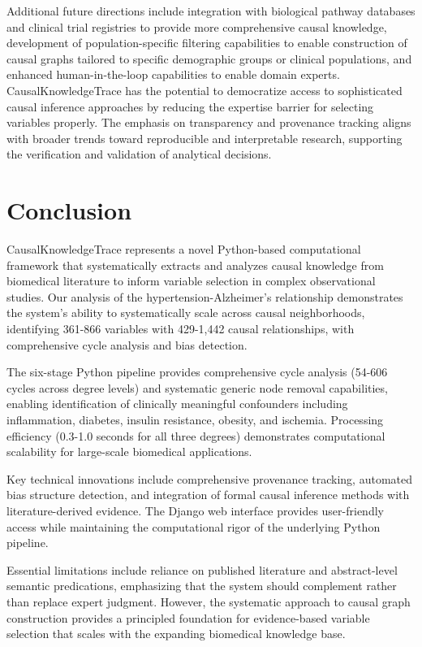 \documentclass[preprint,12pt,numbers,sort&compress]{elsarticle}
\begin{document}
Additional future directions include integration with biological pathway databases and clinical trial registries to provide more comprehensive causal knowledge, development of population-specific filtering capabilities to enable construction of causal graphs tailored to specific demographic groups or clinical populations, and enhanced human-in-the-loop capabilities to enable domain experts. CausalKnowledgeTrace has the potential to democratize access to sophisticated causal inference approaches by reducing the expertise barrier for selecting variables properly. The emphasis on transparency and provenance tracking aligns with broader trends toward reproducible and interpretable research, supporting the verification and validation of analytical decisions.

\section{Conclusion}

CausalKnowledgeTrace represents a novel Python-based computational framework that systematically extracts and analyzes causal knowledge from biomedical literature to inform variable selection in complex observational studies. Our analysis of the hypertension-Alzheimer's relationship demonstrates the system's ability to systematically scale across causal neighborhoods, identifying 361-866 variables with 429-1,442 causal relationships, with comprehensive cycle analysis and bias detection.

The six-stage Python pipeline provides comprehensive cycle analysis (54-606 cycles across degree levels) and systematic generic node removal capabilities, enabling identification of clinically meaningful confounders including inflammation, diabetes, insulin resistance, obesity, and ischemia. Processing efficiency (0.3-1.0 seconds for all three degrees) demonstrates computational scalability for large-scale biomedical applications.

Key technical innovations include comprehensive provenance tracking, automated bias structure detection, and integration of formal causal inference methods with literature-derived evidence. The Django web interface provides user-friendly access while maintaining the computational rigor of the underlying Python pipeline.

Essential limitations include reliance on published literature and abstract-level semantic predications, emphasizing that the system should complement rather than replace expert judgment. However, the systematic approach to causal graph construction provides a principled foundation for evidence-based variable selection that scales with the expanding biomedical knowledge base.
\end{document}
